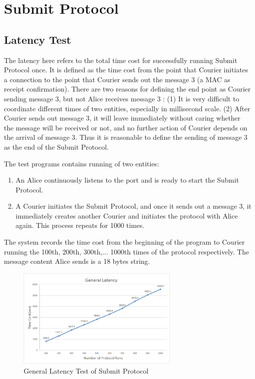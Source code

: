 \section{Submit Protocol}
\subsection{Latency Test}
The latency here refers to the total time cost for successfully running Submit Protocol once. It is defined as the time cost from the point that Courier initiates a connection to the point that Courier sends out the message 3 (a MAC as receipt confirmation). There are two reasons for defining the end point as Courier sending message 3, but not Alice receives message 3 : (1) It is very difficult to coordinate different times of two entities, especially in millisecond scale. (2) After Courier sends out message 3, it will leave immediately without caring whether the message will be received or not, and no further action of Courier depends on the arrival of message 3. Thus it is reasonable to define the sending of message 3 as the end of the Submit Protocol. 

The test programs contains running of two entities:
\begin{enumerate}
\item An Alice continuously listens to the port and is ready to start the Submit Protocol.
\item A Courier initiates the Submit Protocol, and once it sends out a message 3, it immediately creates another Courier and initiates the protocol with Alice again. This process repeats for 1000 times.
\end{enumerate}
The system records the time cost from the beginning of the program to Courier running the 100th, 200th, 300th,... 1000th times of the protocol respectively. The message content Alice sends is a 18 bytes string.

\begin{figure}[h!]
\centering
\includegraphics[width=0.7\textwidth,natwidth=719,natheight=447]{figures/latencysubmit.png}
\caption{General Latency Test of Submit Protocol}
\label{fig:latencysubmit}
\end{figure}

